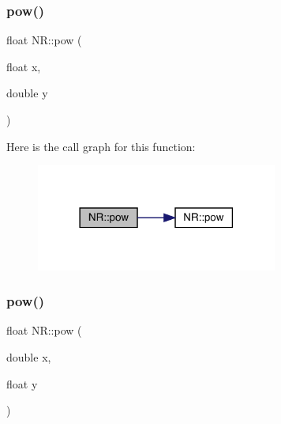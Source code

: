 \mbox{\label{namespaceNR_a519f9a284cc5f48e57acafa04ad862df}} 
\subsubsection{\texorpdfstring{pow()}{pow()}\hspace{0.1cm}{\footnotesize\ttfamily [1/2]}}
{\footnotesize\ttfamily float N\+R\+::pow (\begin{DoxyParamCaption}\item[{float}]{x,  }\item[{double}]{y }\end{DoxyParamCaption})\hspace{0.3cm}{\ttfamily [inline]}}

Here is the call graph for this function\+:
\nopagebreak
\begin{figure}[H]
\begin{center}
\leavevmode
\includegraphics[width=225pt]{da/d46/namespaceNR_a519f9a284cc5f48e57acafa04ad862df_cgraph}
\end{center}
\end{figure}
\mbox{\label{namespaceNR_a7d26b090a44a3b527619df12b89923c9}} 
\subsubsection{\texorpdfstring{pow()}{pow()}\hspace{0.1cm}{\footnotesize\ttfamily [2/2]}}
{\footnotesize\ttfamily float N\+R\+::pow (\begin{DoxyParamCaption}\item[{double}]{x,  }\item[{float}]{y }\end{DoxyParamCaption})\hspace{0.3cm}{\ttfamily [inline]}}

